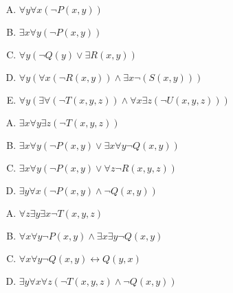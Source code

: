 {{        %
        \begin{practices}
            \begin{enumerate}[A.]
                \item $\forall y \forall x (\neg P(x, y))$
                \item $\exists x \forall y (\neg P(x, y))$
                \item $\forall y (\neg Q(y) \vee \exists R(x, y))$
                \item $\forall y (\forall x (\neg R(x, y)) \wedge \exists x \neg (S(x, y)))$
                \item $\forall y(\exists \forall (\neg T(x, y, z)) \wedge \forall x \exists z (\neg U(x, y, z)))$
            \end{enumerate}
        \end{practices}

        \begin{practices}
            \begin{enumerate}[A.]
                \item $\exists x \forall y \exists z (\neg T(x, y, z))$
                \item $\exists x \forall y (\neg P(x, y) \vee \exists x \forall y \neg Q(x, y))$
                \item $\exists x \forall y (\neg P(x, y) \vee \forall z \neg R(x, y, z))$
                \item $\exists y \forall x (\neg P(x, y) \wedge \neg Q(x, y))$
            \end{enumerate}
        \end{practices}

        \begin{practices}
            \begin{enumerate}[A.]
                \item $\forall z \exists y \exists x \neg T(x, y, z)$
                \item $\forall x \forall y \neg P(x, y) \wedge \exists x \exists y \neg Q(x, y)$
                \item $\forall x \forall y \neg Q(x, y) \leftrightarrow Q(y, x)$
                \item $\exists y \forall x \forall z (\neg T(x, y, z) \wedge \neg Q(x, y))$
            \end{enumerate}
        \end{practices}

}}
